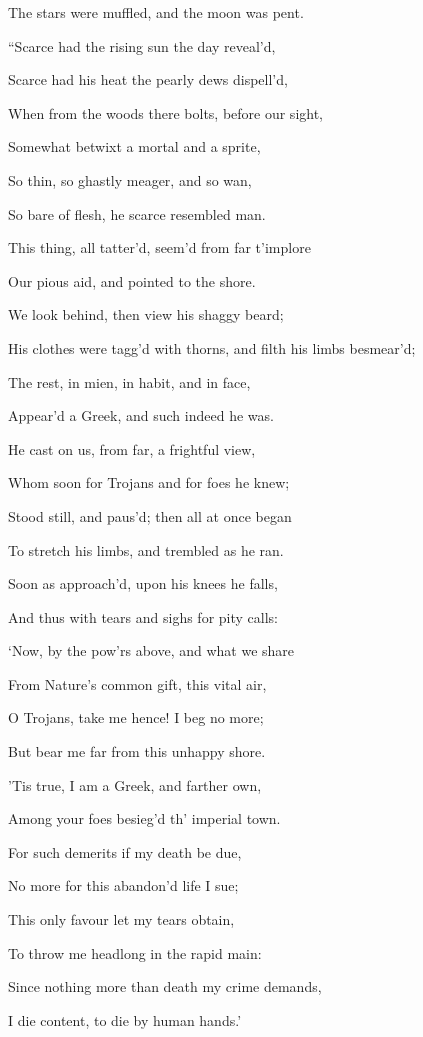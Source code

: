The stars were muffled, and the moon was pent.

“Scarce had the rising sun the day reveal’d,

Scarce had his heat the pearly dews dispell’d,

When from the woods there bolts, before our sight,

Somewhat betwixt a mortal and a sprite,

So thin, so ghastly meager, and so wan,

So bare of flesh, he scarce resembled man.

This thing, all tatter’d, seem’d from far t’implore

Our pious aid, and pointed to the shore.

We look behind, then view his shaggy beard;

His clothes were tagg’d with thorns, and filth his limbs besmear’d;

The rest, in mien, in habit, and in face,

Appear’d a Greek, and such indeed he was.

He cast on us, from far, a frightful view,

Whom soon for Trojans and for foes he knew;

Stood still, and paus’d; then all at once began

To stretch his limbs, and trembled as he ran.

Soon as approach’d, upon his knees he falls,

And thus with tears and sighs for pity calls:

‘Now, by the pow’rs above, and what we share

From Nature’s common gift, this vital air,

O Trojans, take me hence! I beg no more;

But bear me far from this unhappy shore.

’Tis true, I am a Greek, and farther own,

Among your foes besieg’d th’ imperial town.

For such demerits if my death be due,

No more for this abandon’d life I sue;

This only favour let my tears obtain,

To throw me headlong in the rapid main:

Since nothing more than death my crime demands,

I die content, to die by human hands.’

